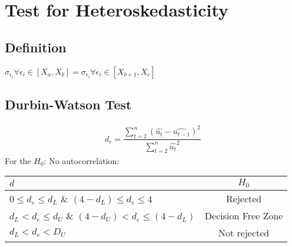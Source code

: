 \documentclass[../main.tex]{subfile}
\begin{document}
    \section{Test for Heteroskedasticity}
    \subsection{Definition} $\sigma_{\epsilon_i} \forall  \epsilon_i \in [X_a, X_b] = \sigma_{\epsilon_i} \forall  \epsilon_i \in [X_{b+1}, X_c]$
    \subsection{Durbin-Watson Test}
    \begin{align}
        d_e = \dfrac{\sum_{t=2}^{n} (\hat{u_t}-\hat{u_{t-1}})^2}{\sum_{t=2}^{n} \hat{u_t}^2}
    \end{align}
    For the $H_0$: No autocorrelation:
    \begin{table}[!h]
        \centering
        \begin{tabular}{l|c}
            $d$ & $H_0$\\
            \hline
            $0 \leq d_e \leq d_L$ \& $(4-d_L) \leq d_e \leq 4$ & Rejected\\
            $d_L < d_e \leq d_U$ \& $(4-d_U) < d_e \leq (4-d_L)$ & Decision Free Zone\\
            $d_L < d_e < D_U$ & Not rejected
        \end{tabular}
    \end{table}
\end{document}
